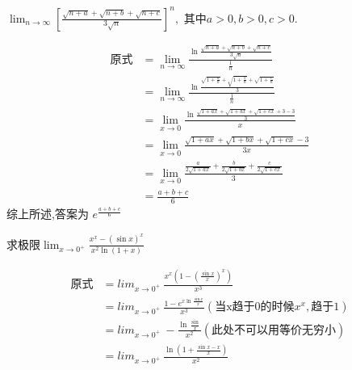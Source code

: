 \documentclass[12pt, a4paper, oneside, UTF8]{ctexbook}  %
\begin{document}
\begin{sloppypar}
\begin{itemize}
\begin{problem}
              $\lim_{n\to\infty}\left[\frac{\sqrt{n+a}+\sqrt{n+b}+\sqrt{n+c}}{3\sqrt{n}}\right]^n,\text{ 其中}a>0,b>0,c>0.$
              \end{problem}
              \begin{solution}
                  \begin{align*}
                      \text{原式} & =   \lim_{n\rightarrow\infty}\frac{\ln\frac{\sqrt{n+a}+\sqrt{n+b}+\sqrt{n+c}}{3\sqrt{n}}}{\frac{1}{n}}              \\
                                & = \lim_{n\to\infty}\frac{\ln\frac{\sqrt{1+\frac{a}{n}}+\sqrt{1+\frac{b}{n}}+\sqrt{1+\frac{c}{n}}}{3}}{\frac{1}{n}}  \\
                                & = \lim_{x\to0}\frac{\ln\frac{\sqrt{1+ax}+\sqrt{1+bx}+\sqrt{1+cx}+3-3}{3}}{x}                                        \\
                                & = \lim_{x\rightarrow0}\frac{\sqrt{1+ax}+\sqrt{1+bx}+\sqrt{1+cx}-3}{3x}                                              \\
                                & = \operatorname*{lim}_{x\rightarrow0}\frac{\frac{a}{2\sqrt{1+ax}}+\frac{b}{2\sqrt{1+bx}}+\frac{c}{2\sqrt{1+cx}}}{3} \\
                                & = \frac{a+b+c}{6}
                  \end{align*}
                  综上所述,答案为  $e^{\frac{a+b+c}{6}}$
              \end{solution}
              \begin{problem}
              求极限$\operatorname*{lim}_{x\to0^+}\frac{x^{x}-(\sin x)^{x}}{x^{2}\ln(1+x)}$
              \end{problem}
              \begin{solution}
                  \begin{align*}
                      \text{原式} & = {lim}_{x\to0^+}\ \frac{x^x (1-(\frac{\sin x}{x})^x)}{x^3}                               \\
                                & = {lim}_{x\to0^+}\ \frac{1-e^{x\ln \frac{\sin x}{x}}}{x^3}(\text{当x趋于0的时候}x^x,\text{趋于1}) \\
                                & = {lim}_{x\to0^+}\ - \frac{\ln \frac{\sin}{x}}{x^2} (\text{此处不可以用等价无穷小})                  \\
                                & = {lim}_{x\to0^+}\ \frac{\ln (1+\frac{\sin x - x}{x})}{x^2}                               \\

\end{align*}
\end{solution}
\end{itemize}
\end{sloppypar}
\end{document}
